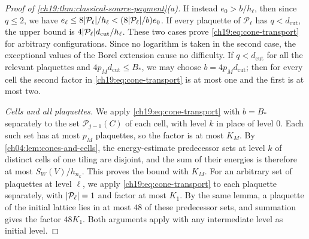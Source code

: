 \begin{proof}[Proof of \cref{ch19:thm:classical-source-payment}(a)]
If instead $e_0>b/h_\ell$, then since $q\le2$, we have $e_\ell\le8\lvert \mathcal P_\ell\rvert/h_\ell<(8\lvert \mathcal P_\ell\rvert/b)e_0$. If every plaquette of $\mathcal P_\ell$ has $q<d_{\mathrm{cut}}$, the upper bound is $4\lvert \mathcal P_\ell\rvert d_{\mathrm{cut}}/h_\ell$. These two cases prove \eqref{ch19:eq:cone-transport} for arbitrary configurations. Since no logarithm is taken in the second case, the exceptional values of the Borel extension cause no difficulty. If $q<d_{\mathrm{cut}}$ for all the relevant plaquettes and $4p_Md_{\mathrm{cut}}\le B_*$, we may choose $b=4p_Md_{\mathrm{cut}}$; then for every cell the second factor in \eqref{ch19:eq:cone-transport} is at most one and the first is at most two.

\emph{Cells and all plaquettes.} We apply \eqref{ch19:eq:cone-transport} with $b=B_*$ separately to the set $\mathcal P_{j-1}(C)$ of each cell, with level $k$ in place of level $0$. Each such set has at most $p_M$ plaquettes, so the factor is at most $K_M$. By \cref{ch04:lem:cones-and-cells}, the energy-estimate predecessor sets at level $k$ of distinct cells of one tiling are disjoint, and the sum of their energies is therefore at most $S_W(V)/h_{n_k}$. This proves the bound with $K_M$. For an arbitrary set of plaquettes at level $\ell$, we apply \eqref{ch19:eq:cone-transport} to each plaquette separately, with $\lvert \mathcal P_\ell\rvert=1$ and factor at most $K_1$. By the same lemma, a plaquette of the initial lattice lies in at most $48$ of these predecessor sets, and summation gives the factor $48K_1$. Both arguments apply with any intermediate level as initial level.
\end{proof}

